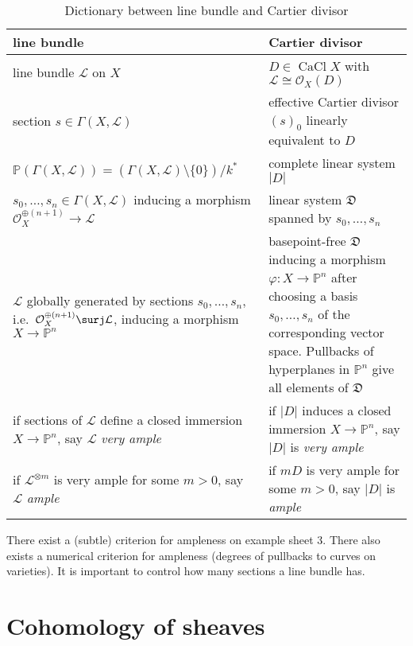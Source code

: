 \documentclass[a4paper]{article}
\renewcommand*{\P}{\mathbb{P}}
\newcommand{\sh}[1]{\mathcal{#1}} %
\DeclareMathOperator{\CaCl}{CaCl} %
\begin{document}
\begin{table}[h]
  \centering
  \begin{tabular}{p{}|p{}}
    line bundle & Cartier divisor \\ \hline
    line bundle \(\sh L\) on \(X\) & \(D \in \CaCl X\) with \(\sh L \cong \sh O_X(D)\) \\ \hline
    section \(s \in \Gamma(X, \sh L)\) & effective Cartier divisor \((s)_0\) linearly equivalent to \(D\) \\ \hline
    \(\P(\Gamma(X, \sh L)) = (\Gamma(X, \sh L) \setminus \{0\})/k^*\) & complete linear system \(|D|\) \\ \hline
    \(s_0, \dots, s_n \in \Gamma(X, \sh L)\) inducing a morphism \(\sh O_X^{\oplus (n + 1)} \to \sh L\) & linear system \(\mathfrak D\) spanned by \(s_0, \dots, s_n\) \\ \hline
    \(\sh L\) globally generated\index{globally generated} by sections \(s_0, \dots, s_n\), i.e.\ \(\sh O_X^{\oplus(n + 1)} \surj \sh L\), inducing a morphism \(X \to \P^n\) & basepoint-free \(\mathfrak D\) inducing a morphism \(\varphi: X \to \P^n\) after choosing a basis \(s_0, \dots, s_n\) of the corresponding vector space. Pullbacks of hyperplanes in \(\P^n\) give all elements of \(\mathfrak D\) \\ \hline
    if sections of \(\sh L\) define a closed immersion \(X \to \P^n\), say \(\sh L\) \emph{very ample}\index{very ample} & if \(|D|\) induces a closed immersion \(X \to \P^n\), say \(|D|\) is \emph{very ample} \\ \hline
    if \(\sh L^{\otimes m}\) is very ample for some \(m > 0\), say \(\sh L\) \emph{ample}\index{ample} & if \(mD\) is very ample for some \(m > 0\), say \(|D|\) is \emph{ample} 
  \end{tabular}
  \caption{Dictionary between line bundle and Cartier divisor}
\end{table}

\begin{remark}
  There exist a (subtle) criterion for ampleness on example sheet 3. There also exists a numerical criterion for ampleness (degrees of pullbacks to curves on varieties). It is important to control how many sections a line bundle has.
\end{remark}

\section{Cohomology of sheaves}
\end{document}
